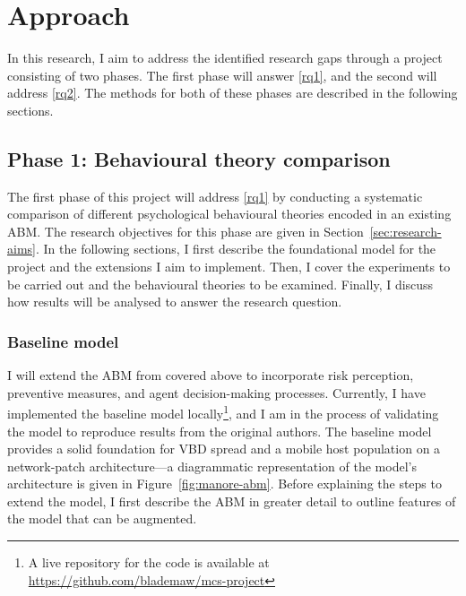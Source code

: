 \section{Approach}\label{sec:approach}

In this research, I aim to address the identified research gaps through a project consisting of two phases. The first phase will answer \ref{rq1}, and the second will address \ref{rq2}. The methods for both of these phases are described in the following sections.

\subsection{Phase 1: Behavioural theory comparison}

The first phase of this project will address \ref{rq1} by conducting a systematic comparison of different psychological behavioural theories encoded in an existing ABM. The research objectives for this phase are given in Section~\ref{sec:research-aims}. In the following sections, I first describe the foundational model for the project and the extensions I aim to implement. Then, I cover the experiments to be carried out and the behavioural theories to be examined. Finally, I discuss how results will be analysed to answer the research question.

\subsubsection{Baseline model}\label{sec:baseline-model}

I will extend the ABM from \citet{manore_network-patch_2015} covered above to incorporate risk perception, preventive measures, and agent decision-making processes. Currently, I have implemented the baseline model locally\footnote{A live repository for the code is available at \url{https://github.com/blademaw/mcs-project}}, and I am in the process of validating the model to reproduce results from the original authors. The baseline model provides a solid foundation for VBD spread and a mobile host population on a network-patch architecture---a diagrammatic representation of the model's architecture is given in Figure~\ref{fig:manore-abm}. Before explaining the steps to extend the model, I first describe the ABM in greater detail to outline features of the model that can be augmented.



